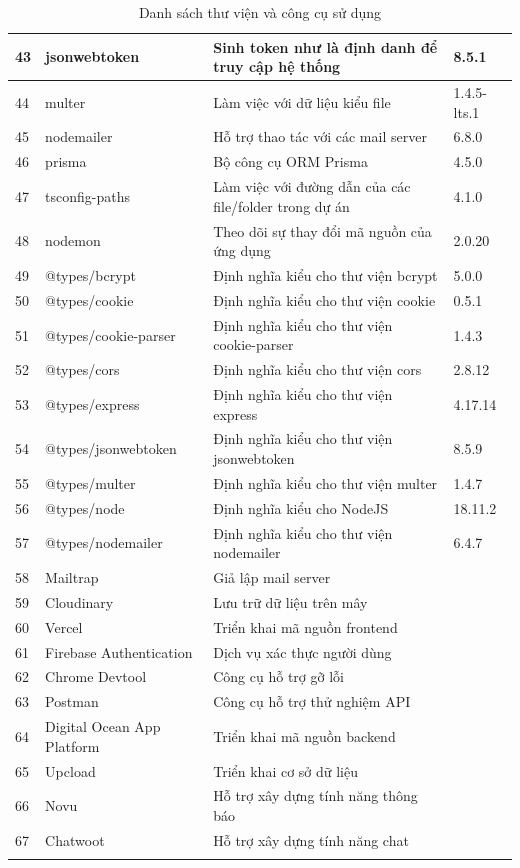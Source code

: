 \documentclass[../DoAn.tex]{subfiles}
\begin{document}
\begin{longtable}{|p{}|p{}|p{}|p{}|}
43 & jsonwebtoken & Sinh token như là định danh để truy cập hệ thống & 8.5.1 \\ \hline
44 & multer & Làm việc với dữ liệu kiểu file & 1.4.5-lts.1 \\ \hline
45 & nodemailer & Hỗ trợ thao tác với các mail server & 6.8.0 \\ \hline
46 & prisma & Bộ công cụ ORM Prisma & 4.5.0 \\ \hline
47 & tsconfig-paths & Làm việc với đường dẫn của các file/folder trong dự án & 4.1.0 \\ \hline
48 & nodemon & Theo dõi sự thay đổi mã nguồn của ứng dụng & 2.0.20 \\ \hline
49 & @types/bcrypt & Định nghĩa kiểu cho thư viện bcrypt & 5.0.0 \\ \hline
50 & @types/cookie & Định nghĩa kiểu cho thư viện cookie & 0.5.1 \\ \hline
51 & @types/cookie-parser & Định nghĩa kiểu cho thư viện cookie-parser & 1.4.3 \\ \hline
52 & @types/cors & Định nghĩa kiểu cho thư viện cors & 2.8.12 \\ \hline
53 & @types/express & Định nghĩa kiểu cho thư viện express & 4.17.14 \\ \hline
54 & @types/jsonwebtoken & Định nghĩa kiểu cho thư viện jsonwebtoken & 8.5.9 \\ \hline
55 & @types/multer & Định nghĩa kiểu cho thư viện multer & 1.4.7 \\ \hline
56 & @types/node & Định nghĩa kiểu cho NodeJS & 18.11.2 \\ \hline
57 & @types/nodemailer & Định nghĩa kiểu cho thư viện nodemailer & 6.4.7 \\ \hline
58 & Mailtrap & Giả lập mail server &  \\ \hline
59 & Cloudinary & Lưu trữ dữ liệu trên mây &  \\ \hline
60 & Vercel & Triển khai mã nguồn frontend &  \\ \hline
61 & Firebase Authentication & Dịch vụ xác thực người dùng & \\ \hline
62 & Chrome Devtool & Công cụ hỗ trợ gỡ lỗi & \\ \hline
63 & Postman & Công cụ hỗ trợ thử nghiệm API & \\ \hline
64 & Digital Ocean App Platform & Triển khai mã nguồn backend & \\ \hline
65 & Upcload & Triển khai cơ sở dữ liệu & \\ \hline
66 & Novu & Hỗ trợ xây dựng tính năng thông báo & \\ \hline
67 & Chatwoot & Hỗ trợ xây dựng tính năng chat & \\ \hline
\caption{Danh sách thư viện và công cụ sử dụng}
\end{longtable}
\end{document}
